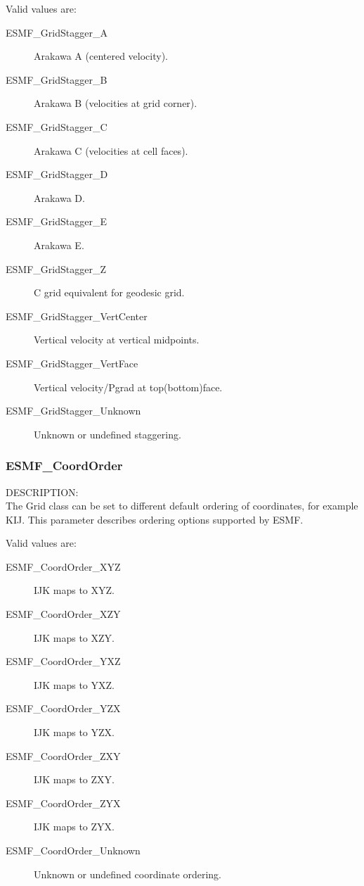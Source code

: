 Valid values are:
\begin{description}
   \item [ESMF\_GridStagger\_A]
         Arakawa A (centered velocity).
   \item [ESMF\_GridStagger\_B]
         Arakawa B (velocities at grid corner).
   \item [ESMF\_GridStagger\_C]
         Arakawa C (velocities at cell faces).
   \item [ESMF\_GridStagger\_D]
         Arakawa D.
   \item [ESMF\_GridStagger\_E]
         Arakawa E.
   \item [ESMF\_GridStagger\_Z]
         C grid equivalent for geodesic grid.
   \item [ESMF\_GridStagger\_VertCenter] 
         Vertical velocity at vertical midpoints.
   \item [ESMF\_GridStagger\_VertFace]
         Vertical velocity/Pgrad at top(bottom)face.
   \item [ESMF\_GridStagger\_Unknown]
         Unknown or undefined staggering.

\end{description}

\subsubsection{ESMF\_CoordOrder}

{\sf DESCRIPTION:\\}
The Grid class can be set to different default ordering of coordinates, for
example KIJ.  This parameter describes ordering options supported by ESMF.

Valid values are:
\begin{description}
   \item [ESMF\_CoordOrder\_XYZ]
         IJK maps to XYZ.
   \item [ESMF\_CoordOrder\_XZY]
         IJK maps to XZY.
   \item [ESMF\_CoordOrder\_YXZ]
         IJK maps to YXZ.
   \item [ESMF\_CoordOrder\_YZX]
         IJK maps to YZX.
   \item [ESMF\_CoordOrder\_ZXY]
         IJK maps to ZXY.
   \item [ESMF\_CoordOrder\_ZYX]
         IJK maps to ZYX.
   \item [ESMF\_CoordOrder\_Unknown]
         Unknown or undefined coordinate ordering.
\end{description}

